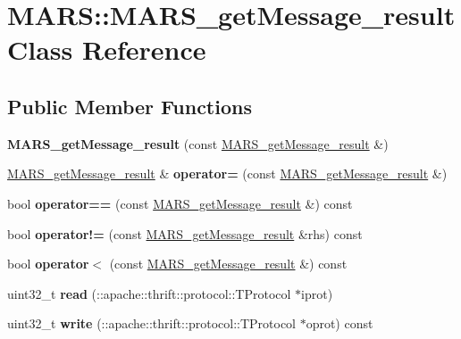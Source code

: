 \hypertarget{classMARS_1_1MARS__getMessage__result}{}\section{M\+A\+RS\+:\+:M\+A\+R\+S\+\_\+get\+Message\+\_\+result Class Reference}
\label{classMARS_1_1MARS__getMessage__result}
\subsection*{Public Member Functions}
\begin{DoxyCompactItemize}
\item 
\mbox{\label{classMARS_1_1MARS__getMessage__result_a13240f4960a3dc0ae801052ef8611fee}} 
{\bfseries M\+A\+R\+S\+\_\+get\+Message\+\_\+result} (const \hyperlink{classMARS_1_1MARS__getMessage__result}{M\+A\+R\+S\+\_\+get\+Message\+\_\+result} \&)
\item 
\mbox{\label{classMARS_1_1MARS__getMessage__result_a7fbb762ac52b4965ca978bcb5edf3e50}} 
\hyperlink{classMARS_1_1MARS__getMessage__result}{M\+A\+R\+S\+\_\+get\+Message\+\_\+result} \& {\bfseries operator=} (const \hyperlink{classMARS_1_1MARS__getMessage__result}{M\+A\+R\+S\+\_\+get\+Message\+\_\+result} \&)
\item 
\mbox{\label{classMARS_1_1MARS__getMessage__result_aa16640690688af777e2ab5991f136b4e}} 
bool {\bfseries operator==} (const \hyperlink{classMARS_1_1MARS__getMessage__result}{M\+A\+R\+S\+\_\+get\+Message\+\_\+result} \&) const
\item 
\mbox{\label{classMARS_1_1MARS__getMessage__result_a311bb2730de58c774b65f338c487c27d}} 
bool {\bfseries operator!=} (const \hyperlink{classMARS_1_1MARS__getMessage__result}{M\+A\+R\+S\+\_\+get\+Message\+\_\+result} \&rhs) const
\item 
\mbox{\label{classMARS_1_1MARS__getMessage__result_a8a7b7e5f8b898137f2b9886b2ff58d0c}} 
bool {\bfseries operator$<$} (const \hyperlink{classMARS_1_1MARS__getMessage__result}{M\+A\+R\+S\+\_\+get\+Message\+\_\+result} \&) const
\item 
\mbox{\label{classMARS_1_1MARS__getMessage__result_a901ff5a0617227f78868664d56e0e16c}} 
uint32\+\_\+t {\bfseries read} (\+::apache\+::thrift\+::protocol\+::\+T\+Protocol $\ast$iprot)
\item 
\mbox{\label{classMARS_1_1MARS__getMessage__result_abbd2918d4280f9a79df100182bd103d1}} 
uint32\+\_\+t {\bfseries write} (\+::apache\+::thrift\+::protocol\+::\+T\+Protocol $\ast$oprot) const
\end{DoxyCompactItemize}


